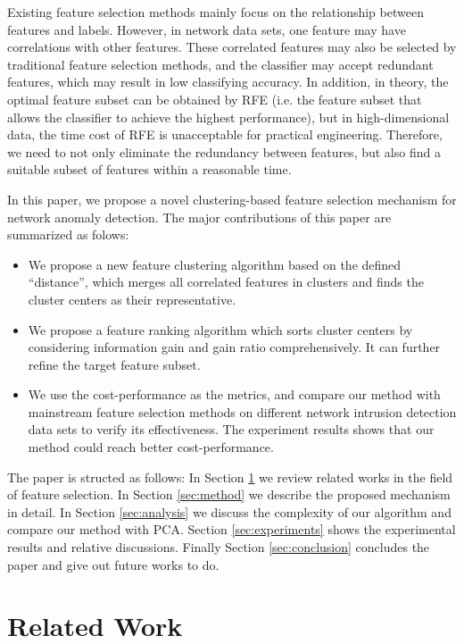 \documentclass{ieeeaccess}
\theoremstyle{definition}
\begin{document}
Existing feature selection methods mainly focus on the relationship between features and labels. 
However, in network data sets, one feature may have correlations with other features. 
These correlated features may also be selected by traditional feature selection methods, and the classifier may accept redundant features, which may result in low classifying accuracy. 
In addition, in theory, the optimal feature subset can be obtained by RFE (i.e. the feature subset that allows the classifier to achieve the highest performance), but in high-dimensional data, the time cost of RFE is unacceptable for practical engineering. 
Therefore, we need to not only eliminate the redundancy between features, but also find a suitable subset of features within a reasonable time.

In this paper, we propose a novel clustering-based feature selection mechanism for network anomaly detection.
The major contributions of this paper are summarized as folows:

\begin{itemize}
    \item We propose a new feature clustering algorithm based on the defined ``distance'', which merges all correlated features in clusters and finds the cluster centers as their representative.
    \item We propose a feature ranking algorithm which sorts cluster centers by considering information gain and gain ratio comprehensively. It can further refine the target feature subset. 
    \item We use the cost-performance as the metrics, and compare our method with mainstream feature selection methods on different network intrusion detection data sets to verify its effectiveness. The experiment results shows that our method could reach better cost-performance.
\end{itemize}

The paper is structed as follows: In Section \ref{sec:related-work} we review related works in the field of feature selection. In Section \ref{sec:method} we describe the proposed mechanism in detail. In Section \ref{sec:analysis} we discuss the complexity of our algorithm and compare our method with PCA. Section \ref{sec:experiments} shows the experimental results and relative discussions. Finally Section \ref{sec:conclusion} concludes the paper and give out future works to do.

\section{Related Work}
\label{sec:related-work}
\end{document}
